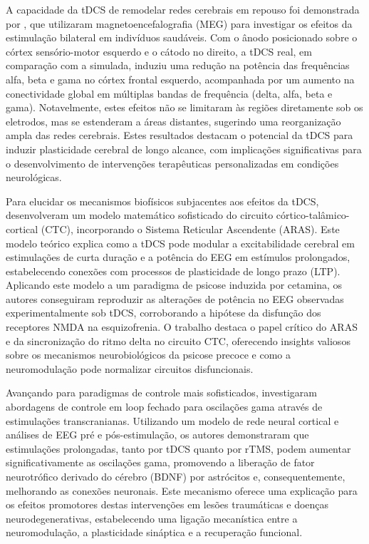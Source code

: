 A capacidade da tDCS de remodelar redes cerebrais em repouso foi demonstrada por , que utilizaram magnetoencefalografia (MEG) para investigar os efeitos da estimulação bilateral em indivíduos saudáveis. Com o ânodo posicionado sobre o córtex sensório-motor esquerdo e o cátodo no direito, a tDCS real, em comparação com a simulada, induziu uma redução na potência das frequências alfa, beta e gama no córtex frontal esquerdo, acompanhada por um aumento na conectividade global em múltiplas bandas de frequência (delta, alfa, beta e gama). Notavelmente, estes efeitos não se limitaram às regiões diretamente sob os eletrodos, mas se estenderam a áreas distantes, sugerindo uma reorganização ampla das redes cerebrais. Estes resultados destacam o potencial da tDCS para induzir plasticidade cerebral de longo alcance, com implicações significativas para o desenvolvimento de intervenções terapêuticas personalizadas em condições neurológicas.

Para elucidar os mecanismos biofísicos subjacentes aos efeitos da tDCS,  desenvolveram um modelo matemático sofisticado do circuito córtico-talâmico-cortical (CTC), incorporando o Sistema Reticular Ascendente (ARAS). Este modelo teórico explica como a tDCS pode modular a excitabilidade cerebral em estimulações de curta duração e a potência do EEG em estímulos prolongados, estabelecendo conexões com processos de plasticidade de longo prazo (LTP). Aplicando este modelo a um paradigma de psicose induzida por cetamina, os autores conseguiram reproduzir as alterações de potência no EEG observadas experimentalmente sob tDCS, corroborando a hipótese da disfunção dos receptores NMDA na esquizofrenia. O trabalho destaca o papel crítico do ARAS e da sincronização do ritmo delta no circuito CTC, oferecendo insights valiosos sobre os mecanismos neurobiológicos da psicose precoce e como a neuromodulação pode normalizar circuitos disfuncionais.

Avançando para paradigmas de controle mais sofisticados,  investigaram abordagens de controle em loop fechado para oscilações gama através de estimulações transcranianas. Utilizando um modelo de rede neural cortical e análises de EEG pré e pós-estimulação, os autores demonstraram que estimulações prolongadas, tanto por tDCS quanto por rTMS, podem aumentar significativamente as oscilações gama, promovendo a liberação de fator neurotrófico derivado do cérebro (BDNF) por astrócitos e, consequentemente, melhorando as conexões neuronais. Este mecanismo oferece uma explicação para os efeitos promotores destas intervenções em lesões traumáticas e doenças neurodegenerativas, estabelecendo uma ligação mecanística entre a neuromodulação, a plasticidade sináptica e a recuperação funcional.

